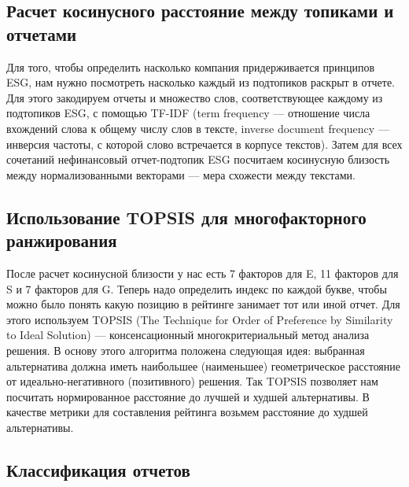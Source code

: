 \documentclass[a4paper, 14pt]{extarticle}
\begin{document}
\subsection{Расчет косинусного расстояние между топиками и отчетами}

Для того, чтобы определить насколько компания придерживается принципов ESG, нам нужно посмотреть насколько каждый из подтопиков раскрыт в отчете. Для этого закодируем отчеты и множество слов, соответствующее каждому из подтопиков ESG, с помощью TF-IDF (term frequency --- отношение числа вхождений слова к общему числу слов в тексте, inverse document frequency --- инверсия частоты, с которой слово встречается в корпусе текстов). Затем для всех сочетаний нефинансовый отчет-подтопик ESG посчитаем косинусную близость между нормализованными векторами --- мера схожести между текстами.

\subsection{Использование TOPSIS для многофакторного ранжирования}

После расчет косинусной близости у нас есть 7 факторов для E, 11 факторов для S и 7 факторов для G. Теперь надо определить индекс по каждой букве, чтобы можно было понять какую позицию в рейтинге занимает тот или иной отчет. Для этого используем TOPSIS (The Technique for Order of Preference by Similarity to Ideal Solution) --- консенсационный многокритериальный метод анализа решения. В основу этого алгоритма положена следующая идея: выбранная альтернатива должна иметь наибольшее (наименьшее) геометрическое расстояние от идеально-негативного (позитивного) решения. Так TOPSIS позволяет нам посчитать нормированное расстояние до лучшей и худшей альтернативы. В качестве метрики для составления рейтинга возьмем расстояние до худшей альтернативы.  

\subsection{Классификация отчетов}
\end{document}
